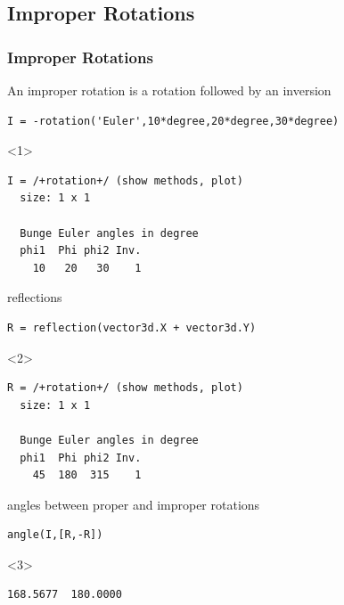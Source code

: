 \documentclass[compress]{beamer}
\begin{document}
\subsection*{Improper Rotations}

\begin{frame}[fragile]
  \frametitle{Improper Rotations}

  \begin{overlayarea}{\textwidth}{7cm}

    An improper rotation is a rotation followed by an inversion
    \begin{lstlisting}[style=input]
I = -rotation('Euler',10*degree,20*degree,30*degree)
    \end{lstlisting}
    \begin{onlyenv}<1>
      \vspace{-0.3cm}
      \begin{lstlisting}[style=output]
I = /+rotation+/ (show methods, plot)
  size: 1 x 1

  Bunge Euler angles in degree
  phi1  Phi phi2 Inv.
    10   20   30    1
  \end{lstlisting}
  \end{onlyenv}

  \pause
  \bigskip

  reflections
  \begin{lstlisting}[style=input]
R = reflection(vector3d.X + vector3d.Y)
  \end{lstlisting}
  \begin{onlyenv}<2>
    \vspace{-0.3cm}
  \begin{lstlisting}[style=output]
R = /+rotation+/ (show methods, plot)
  size: 1 x 1

  Bunge Euler angles in degree
  phi1  Phi phi2 Inv.
    45  180  315    1
  \end{lstlisting}
  \end{onlyenv}

  \pause
  \bigskip

  angles between proper and improper rotations
  \begin{lstlisting}[style=input]
angle(I,[R,-R])
  \end{lstlisting}
  \begin{onlyenv}<3>
    \vspace{-0.3cm}
    \begin{lstlisting}[style=output]
  168.5677  180.0000
  \end{lstlisting}
  \end{onlyenv}


\end{overlayarea}
\end{frame}
\end{document}
